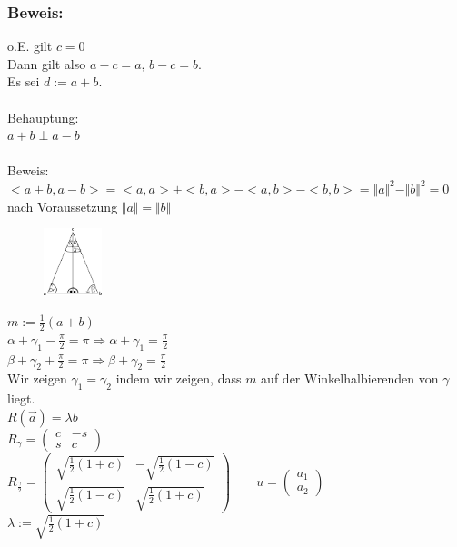 \subsubsection{Beweis:}
o.E. gilt $c=0$\\
Dann gilt also $a-c=a, \, b-c=b$.\\
Es sei $d:=a+b$. \\
\qquad\\
Behauptung:\\
 $a+b\perp a-b$\\
 \qquad\\
Beweis:\\
$<a+b,a-b>=<a,a>+<b,a>-<a,b>-<b,b>=\Vert a \Vert^{2}-\Vert b \Vert^{2} = 0$ nach Voraussetzung $\Vert a \Vert = \Vert b \Vert$\\
%
 \begin{figure}[H]
 \centering
\includegraphics[width=0.15\textwidth]{mainmatter/chapter1/pics/gleichbeweis.png}
\end{figure}
%
$m:=\frac{1}{2}(a+b)$\\
$\alpha + \gamma_{1} - \frac{\pi}{2}=\pi \Rightarrow \alpha + \gamma_{1} = \frac{\pi}{2}$\\
$\beta+\gamma_{2}+\frac{\pi}{2}=\pi\Rightarrow\beta+\gamma_{2}=\frac{\pi}{2}$\\
Wir zeigen $\gamma_{1}=\gamma_{2}$ indem wir zeigen, dass $m$ auf der Winkelhalbierenden von $\gamma$ liegt. \\
$R(\vec{a})=\lambda b$\\
$R_{\gamma}=\begin{pmatrix} c & -s \\ s & c \end{pmatrix}$\\
$R_{\frac{\gamma}{2}}=\begin{pmatrix} \sqrt{\frac{1}{2} (1+c)} & - \sqrt{\frac{1}{2}(1-c)} \\ \sqrt{\frac{1}{2}(1-c)} & \sqrt{\frac{1}{2}(1+c)}\end{pmatrix} \qquad u=\begin{pmatrix} a_{1} \\ a_{2} \end{pmatrix}$\\
$\lambda :=\sqrt{\frac{1}{2}(1+c)}$\\
